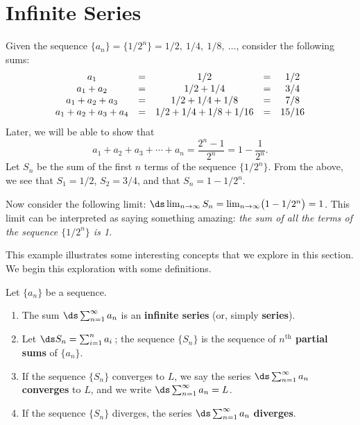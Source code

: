 \section{Infinite Series}\label{sec:series}

Given the sequence $\{a_n\} = \{1/2^n\} = 1/2,\ 1/4,\ 1/8,\ \dotsc$, consider the following sums:\vspace{-.5\baselineskip}
\[
\begin{array}{ c c c c c }
a_1				&=& 1/2					&=& 1/2\\
a_1+a_2			&=& 1/2+1/4				&=& 3/4\\
a_1+a_2+a_3		&=& 1/2+1/4+1/8			&=& 7/8\\
a_1+a_2+a_3+a_4	&=& 1/2+1/4+1/8+1/16		&=& 15/16
\end{array}
\]
Later, we will be able to show that\vspace{-.5\baselineskip}
\[a_1+a_2+a_3+\dotsb+a_n = \frac{2^n-1}{2^n} = 1-\frac{1}{2^n}.\]
Let $S_n$ be the sum of the first $n$ terms of the sequence $\{1/2^n\}$. From the above, we see that $S_1=1/2$, $S_2 = 3/4$, and that $S_n = 1-1/2^n$. 

Now consider the following limit: $\ds \lim_{n\to\infty}S_n = \lim_{n\to\infty}\bigl(1-1/2^n\bigr) = 1$. This limit can be interpreted as saying something amazing: \emph{the sum of \emph{all} the terms of the sequence $\{1/2^n\}$ is 1.} 


This example illustrates some interesting concepts that we explore in this section. We begin this exploration with some definitions.

{
\begin{definition}\label{def:series}
Let $\{a_n\}$ be a sequence.
\begin{enumerate}
\item		The sum $\ds \sum_{n=1}^\infty a_n$ is an \textbf{infinite series} (or, simply \textbf{series}).
\item		Let $\ds S_n = \sum_{i=1}^n a_i$\,; the sequence $\{S_n\}$ is the sequence of \textbf{$n^\text{th}$ partial sums} of $\{a_n\}$.\vspace{-.5\baselineskip}
\item		If the sequence $\{S_n\}$ converges to $L$, we say the series $\ds \sum_{n=1}^\infty a_n$ \textbf{converges} to $L$, and we write $\ds \sum_{n=1}^\infty a_n = L$.\vspace{-.5\baselineskip}
\item		If the sequence $\{S_n\}$ diverges, the series $\ds \sum_{n=1}^\infty a_n$ \textbf{diverges}.
\end{enumerate}
\end{definition}}

